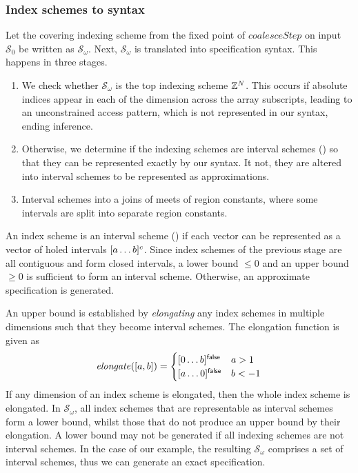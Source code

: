 \subsubsection{Index schemes to syntax}

\newcommand{\finalSet}{\mathcal{S}_\omega}
Let the covering indexing scheme from the fixed point of
$\mathit{coalesceStep}$ on input $\mathcal{S}_0$ be written as
$\finalSet{}$.  Next, $\finalSet{}$ is translated into specification
syntax. This happens in three stages.
%
\begin{enumerate}[leftmargin=2em]
  \item We check whether $\finalSet{}$
  is the top indexing scheme $\textnormal{$\mathbb{Z}$}{}^N$. This occurs if absolute indices
  appear in each of the dimension across the array subscripts,
  leading to an unconstrained access pattern, which is not represented
  in our syntax, ending inference.

  \item Otherwise, we determine if the indexing schemes are interval
  schemes () so that they can be represented
  exactly by our syntax. It not, they are altered into interval
  schemes to be represented as approximations.

  \item Interval schemes into a joins of meets
  of region constants, where some intervals are split into separate
  region constants.
\end{enumerate}
%
An index scheme is an interval scheme () if
each vector can be represented as a vector of holed intervals
$\textnormal{$\lbrack a\dots b\rbrack^{c}$}$.  Since index schemes of the previous stage are all
contiguous and form closed intervals, a lower bound $\leq 0$ and an
upper bound $\geq 0$ is sufficient to form an interval scheme.
Otherwise, an approximate specification is generated.

An upper bound is established by
\emph{elongating} any index schemes in multiple dimensions such that
they become interval schemes. The elongation function is
given as
%
\begin{align*}
  \mathit{elongate}([a,b]) = \begin{cases}
    \textnormal{$\lbrack0\dots b\rbrack^{\textsf{false}}$} & a > 1 \\
    \textnormal{$\lbrack a\dots0\rbrack^{\textsf{false}}$} & b < -1
  \end{cases}
\end{align*}
%
If any dimension of an index scheme is elongated, then the whole index
scheme is elongated. In $\finalSet$, all index schemes that are
representable as interval schemes form a lower bound, whilst those
that do not produce an upper bound by their elongation. A lower bound
may not be generated if all indexing schemes are not interval schemes.
In the case of our example, the resulting $\finalSet$ comprises a set
of interval schemes, thus we can generate an exact specification.

